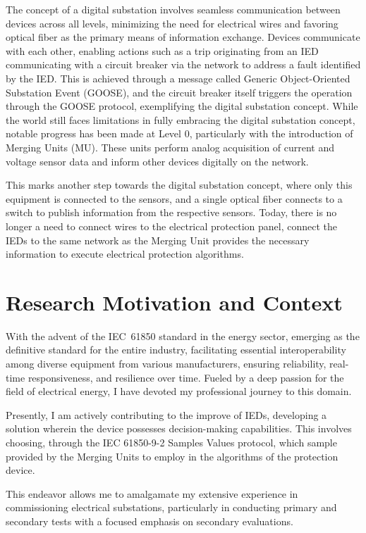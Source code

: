 The concept of a digital substation involves seamless communication between devices across all levels, minimizing the need for electrical wires and favoring optical fiber as the primary means of information exchange. Devices communicate with each other, enabling actions such as a trip originating from an IED communicating with a circuit breaker via the network to address a fault identified by the IED. This is achieved through a message called Generic Object-Oriented Substation Event (GOOSE), and the circuit breaker itself triggers the operation through the GOOSE protocol, exemplifying the digital substation concept. While the world still faces limitations in fully embracing the digital substation concept, notable progress has been made at Level 0, particularly with the introduction of Merging Units (MU). These units perform analog acquisition of current and voltage sensor data and inform other devices digitally on the network.

This marks another step towards the digital substation concept, where only this equipment is connected to the sensors, and a single optical fiber connects to a switch to publish information from the respective sensors. Today, there is no longer a need to connect wires to the electrical protection panel, connect the IEDs to the same network as the Merging Unit provides the necessary information to execute electrical protection algorithms.

\section{Research Motivation and Context}
With the advent of the IEC~61850 standard in the energy sector, emerging as the definitive standard for the entire industry, facilitating essential interoperability among diverse equipment from various manufacturers, ensuring reliability, real-time responsiveness, and resilience over time. Fueled by a deep passion for the field of electrical energy, I have devoted my professional journey to this domain.

Presently, I am actively contributing to the improve of IEDs, developing a solution wherein the device possesses decision-making capabilities. This involves choosing, through the IEC 61850-9-2 Samples Values protocol, which sample provided by the Merging Units to employ in the algorithms of the protection device.

This endeavor allows me to amalgamate my extensive experience in commissioning electrical substations, particularly in conducting primary and secondary tests with a focused emphasis on secondary evaluations.

